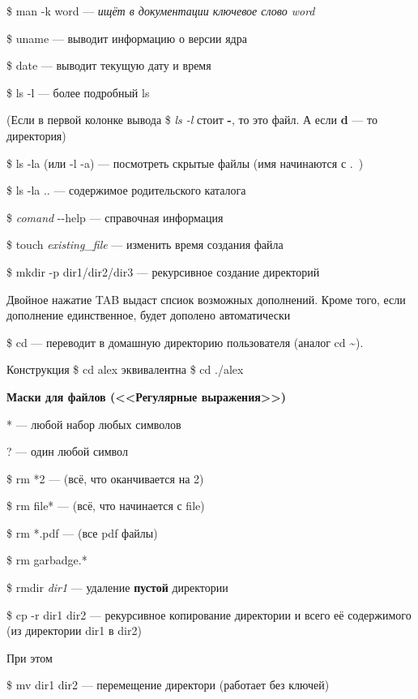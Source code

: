 \documentclass[oneside, final, 14pt]{extreport} %
\begin{document}
\$ man -k word –– \textit{ищёт в документации ключевое слово word}

\$ uname --- выводит информацию о версии ядра

\$ date --- выводит текущую дату и время

\$ ls -l --- более подробный ls

(Если в первой колонке вывода \$ \textit{ls -l} стоит \textbf{-}, то это файл. А если \textbf{d} --- то директория)

\$ ls -la (или -l -a) --- посмотреть скрытые файлы (имя начинаются с .~)

\$ ls -la .. --- содержимое родительского каталога

\$ \textit{comand} \--\--help --- справочная информация

\$ touch \textit{existing\_file} --- изменить время создания файла

\$ mkdir -p dir1/dir2/dir3 --- рекурсивное создание директорий

Двойное нажатие TAB выдаст спсиок возможных дополнений. Кроме того, если дополнение единственное, 
будет дополено автоматически

\$ cd --- переводит в домашную директорию пользователя (аналог cd \textasciitilde).

Конструкция \$ cd alex эквивалентна \$ cd ./alex

\vspace{\baselineskip}
\textbf{Маски для файлов (<<Регулярные выражения>>)}

* --- любой набор любых символов

? --- один любой символ

\$ rm *2 --- (всё, что оканчивается на 2)

\$ rm file* --- (всё, что начинается с file)

\$ rm *.pdf --- (все pdf файлы)

\$ rm garbadge.*

\vspace{\baselineskip}

\$ rmdir \textit{dir1} --- удаление \textbf{пустой} директории

\$ cp -r dir1 dir2 --- рекурсивное копирование директории и всего её содержимого
(из директории dir1 в dir2)

При этом

\$ mv dir1 dir2 --- перемещение директори (работает без ключей)

\vspace{\baselineskip}
\end{document}

